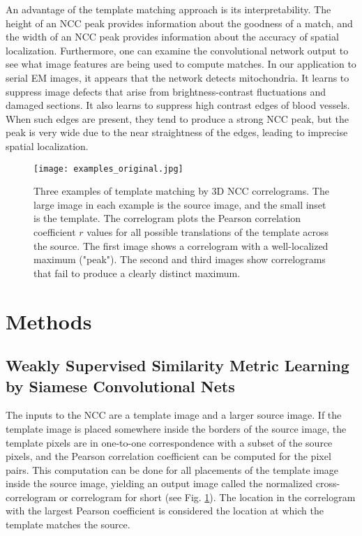 \documentclass{article}
\begin{document}
An advantage of the template matching approach is its interpretability. The height of an NCC peak provides information about the goodness of a match, and the width of an NCC peak provides information about the accuracy of spatial localization. Furthermore, one can examine the convolutional network output to see what image features are being used to compute matches. In our application to serial EM images, it appears that the network detects mitochondria. It learns to suppress image defects that arise from brightness-contrast fluctuations and damaged sections. It also learns to suppress high contrast edges of blood vessels. When such edges are present, they tend to produce a strong NCC peak, but the peak is very wide due to the near straightness of the edges, leading to imprecise spatial localization.





\begin{figure}[h]
  \centering
  
  \texttt{[image: examples\_original.jpg]}
  \caption{Three examples of template matching by 3D NCC correlograms. The large image in each example is the source image, and the small inset is the template. The correlogram plots the Pearson correlation coefficient $r$ values for all possible translations of the template across the source. The first image shows a correlogram with a well-localized maximum ("peak"). The second and third images show correlograms that fail to produce a clearly distinct maximum.}
  \label{ncc_examples}
\end{figure}


\section{Methods}

\subsection{Weakly Supervised Similarity Metric Learning by Siamese Convolutional Nets}

The inputs to the NCC are a template image and a larger source image. If the template image is placed somewhere inside the borders of the source image, the template pixels are in one-to-one correspondence with a subset of the source pixels, and the Pearson correlation coefficient can be computed for the pixel pairs. This computation can be done for all placements of the template image inside the source image, yielding an output image called the normalized cross-correlogram or correlogram for short (see Fig. \ref{ncc_examples}). The location in the correlogram with the largest Pearson coefficient is considered the location at which the template matches the source. 
\end{document}
